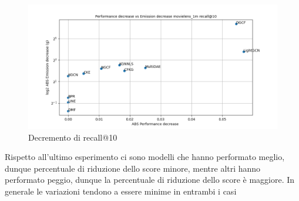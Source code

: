 \begin{figure}[H]
    \centering
     \includegraphics[width=\textwidth]{images/decrement_recall@10_movielens_1m_40_7.png}
    \caption{Decremento di recall@10}
\end{figure}

\noindent Rispetto all'ultimo esperimento ci sono modelli che hanno performato meglio, dunque percentuale di riduzione dello score minore, mentre altri hanno performato peggio, dunque la percentuale di riduzione dello score è maggiore. In generale le variazioni tendono a essere minime in entrambi i casi

